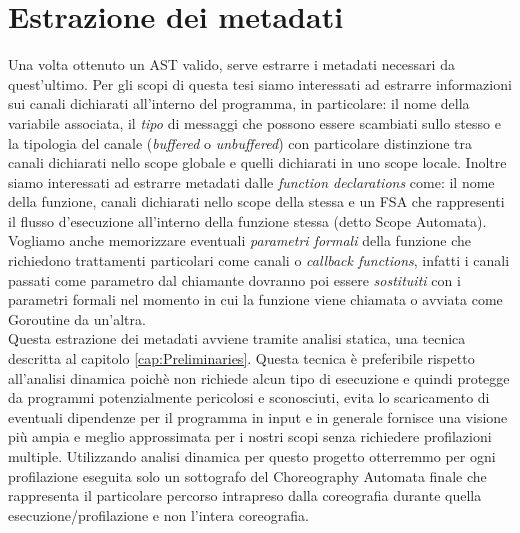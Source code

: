 \section{Estrazione dei metadati}
Una volta ottenuto un AST valido, serve estrarre i metadati necessari da quest'ultimo. Per gli scopi di questa tesi siamo interessati ad estrarre informazioni sui canali dichiarati all'interno del programma, in particolare: il nome della variabile associata, il \emph{tipo} di messaggi che possono essere scambiati sullo stesso e la tipologia del canale (\emph{buffered} o \emph{unbuffered}) con particolare distinzione tra canali dichiarati nello scope globale e quelli dichiarati in uno scope locale. Inoltre siamo interessati ad estrarre metadati dalle \emph{function declarations} come: il nome della funzione, canali dichiarati nello scope della stessa e un FSA che rappresenti il flusso d'esecuzione all'interno della funzione stessa (detto Scope Automata). Vogliamo anche memorizzare eventuali \emph{parametri formali} della funzione che richiedono trattamenti particolari come canali o \emph{callback functions}, infatti i canali passati come parametro dal chiamante dovranno poi essere \emph{sostituiti} con i parametri formali nel momento in cui la funzione viene chiamata o avviata come Goroutine da un'altra. \bigskip \\
Questa estrazione dei metadati avviene tramite analisi statica, una tecnica descritta al capitolo \ref{cap:Preliminaries}. Questa tecnica è preferibile rispetto all'analisi dinamica poichè non richiede alcun tipo di esecuzione e quindi protegge da programmi potenzialmente pericolosi e sconosciuti, evita lo scaricamento di eventuali dipendenze per il programma in input e in generale fornisce una visione più ampia e meglio approssimata per i nostri scopi senza richiedere profilazioni multiple. Utilizzando analisi dinamica per questo progetto otterremmo per ogni profilazione eseguita solo un sottografo del Choreography Automata finale che rappresenta il particolare percorso intrapreso dalla coreografia durante quella esecuzione/profilazione e non l'intera coreografia.

